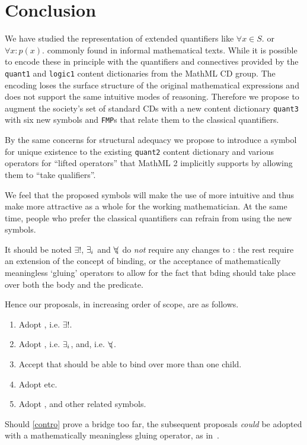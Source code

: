 \documentclass{llncs}
\def\forallin{\forall_{\kern-.25em i}}
\def\existsin{\exists_{\kern-.01em i}}
\begin{document}
\section{Conclusion}\label{sec:concl}

We have studied the representation of extended quantifiers like $\forall x\in S.$ or
$\forall x: p(x).$ commonly found in informal mathematical texts. While it is possible to
encode these in principle with the quantifiers and connectives provided by the
{\texttt{quant1}} and {\texttt{logic1}} content dictionaries from the MathML CD group. The
encoding loses the surface structure of the original mathematical expressions and does not
support the same intuitive modes of reasoning. Therefore we propose to augment the
{\openmath} society's set of standard CDs with a new content dictionary {\texttt{quant3}}
with six new symbols and {\texttt{FMP}}s that relate them to the classical quantifiers.

By the same concerns for structural adequacy we propose to introduce a symbol for unique
existence to the existing {\texttt{quant2}} content dictionary and various operators for
``lifted operators'' that MathML 2 implicitly supports by allowing them to ``take
qualifiers''.

We feel that the proposed symbols will make the use of {\openmath} more intuitive and thus
make {\openmath} more attractive as a whole for the working mathematician. At the same
time, people who prefer the classical quantifiers can refrain from using the new symbols.

It should be noted $\exists!$, $\existsin$ and $\forallin$ do {\emph{not}} require any
changes to {\openmath}: the rest require an extension of the concept of binding, or the
acceptance of mathematically meaningless `gluing' operators to allow for the fact that
bding should take place over both the body and the predicate.

Hence our proposals, in increasing order of scope, are as follows.
\begin{enumerate}
\item Adopt {}, i.e. $\exists!$.
\item Adopt {}, i.e. $\existsin$, and{},
  i.e. $\forallin$.
\item Accept that {} should be able to bind over more than one
  child.\label{contro}
\item Adopt {} etc.
\item Adopt {}, and other related symbols.
\end{enumerate}
Should \ref{contro} prove a bridge too far, the subsequent proposals {\emph{could}} be
adopted with a mathematically meaningless gluing operator, as
in~\cite{DavenportKohlhase2009a}.

\ifshort
\end{document}
